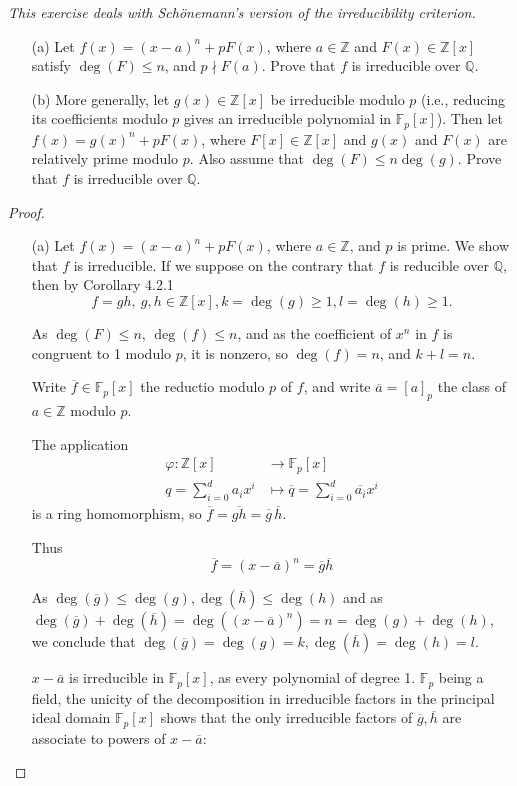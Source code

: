 \documentclass[11pt,a4paper]{article}
\newcommand{\Q}{\mathbb{Q}}
\newcommand{\Z}{\mathbb{Z}}
\newcommand{\F}{\mathbb{F}}
\begin{document}
{\it This exercise deals with Sch\"onemann's version of the irreducibility criterion.
\begin{enumerate}
\item[(a)] Let $f(x) = (x-a)^n + pF(x)$, where $a\in \Z$ and $F(x) \in \Z[x]$ satisfy $\deg(F) \leq n$, and $p\nmid F(a)$. Prove that $f$ is irreducible over $\Q$.
\item[(b)] More generally, let $g(x) \in \Z[x]$ be irreducible modulo $p$ (i.e., reducing its coefficients modulo $p$ gives an irreducible polynomial in $\F_p[x]$). Then let $f(x) = g(x)^n + pF(x)$, where $F[x] \in \Z[x]$ and $g(x)$ and $F(x)$ are relatively prime modulo $p$. Also assume that $\deg(F) \leq n \deg(g)$. Prove that $f$ is irreducible over $\Q$.
\end{enumerate}
}

\begin{proof}
\begin{enumerate}
\item[(a)]
Let $f(x) = (x-a)^n + pF(x)$, where $a\in \mathbb{Z}$, and $p$ is prime. We show that $f$ is irreducible. If we suppose on the contrary that $f$ is reducible over $\Q$, then by Corollary 4.2.1  $$f = g h,\ g,h \in \mathbb{Z}[x], k = \deg(g)\geq 1,l=\deg(h) \geq 1.$$

As $\deg(F) \leq n$, $\deg(f)\leq n$, and as the coefficient of $x^n$ in $f$ is congruent to 1 modulo $p$, it is nonzero, so $\deg(f) = n$, and $k+l=n$.

Write $\overline{f} \in \mathbb{F}_p[x]$ the reductio modulo $p$ of $f$, and write $\overline{a} = [a]_p$ the class of $a\in \mathbb{Z}$ modulo $p$. 

The application 
\begin{align*}
\varphi : \mathbb{Z}[x] &\to \mathbb{F}_p[x]\\
q= \sum_{i=0}^d a_i x^i &\mapsto \overline{q} =  \sum_{i=0}^d \overline{a_i} x^i 
 \end{align*}
is a ring homomorphism, so  $\overline{f} = \overline{gh} = \overline{g}\,\overline{h}$.
 
Thus $$\overline{f} = (x- \overline{a})^n = \overline{g}\overline{h}$$
 
As $\deg(\overline{g}) \leq \deg(g), \deg(\overline{h}) \leq \deg(h)$ and as $\deg(\overline{g})+\deg(\overline{h}) = \deg((x- \overline{a})^n)=n = \deg(g)+ \deg(h)$, we conclude that $\deg(\overline{g}) = \deg(g) = k, \deg(\overline{h})=\deg(h)=l$.
 
 $x-\overline{a}$ is irreducible in $\mathbb{F}_p[x]$, as every polynomial of degree 1. $\mathbb{F}_p$ being a field, the unicity of the decomposition in irreducible factors in  the principal ideal domain $\mathbb{F}_p[x]$ shows that the only irreducible factors of $\overline{g}, \overline{h}$ are associate to powers of $x-\overline{a}$: 
 

\end{enumerate}
\end{proof}
\end{document}
